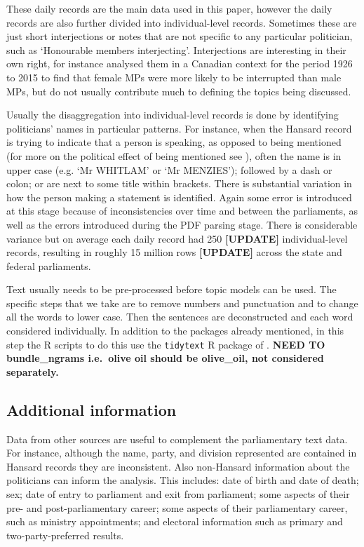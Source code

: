 \documentclass[12pt,]{article}
\theoremstyle{definition}
\theoremstyle{definition}
\theoremstyle{definition}
\theoremstyle{remark}
\begin{document}
These daily records are the main data used in this paper, however the
daily records are also further divided into individual-level records.
Sometimes these are just short interjections or notes that are not
specific to any particular politician, such as `Honourable members
interjecting'. Interjections are interesting in their own right, for
instance \citet{Whyte2017} analysed them in a Canadian context for the
period 1926 to 2015 to find that female MPs were more likely to be
interrupted than male MPs, but do not usually contribute much to
defining the topics being discussed.

Usually the disaggregation into individual-level records is done by
identifying politicians' names in particular patterns. For instance,
when the Hansard record is trying to indicate that a person is speaking,
as opposed to being mentioned (for more on the political effect of being
mentioned see \citet{Alexander2018}), often the name is in upper case
(e.g. `Mr WHITLAM' or `Mr MENZIES'); followed by a dash or colon; or are
next to some title within brackets. There is substantial variation in
how the person making a statement is identified. Again some error is
introduced at this stage because of inconsistencies over time and
between the parliaments, as well as the errors introduced during the PDF
parsing stage. There is considerable variance but on average each daily
record had 250 \textbf{{[}UPDATE{]}} individual-level records, resulting
in roughly 15 million rows \textbf{{[}UPDATE{]}} across the state and
federal parliaments.

Text usually needs to be pre-processed before topic models can be used.
The specific steps that we take are to remove numbers and punctuation
and to change all the words to lower case. Then the sentences are
deconstructed and each word considered individually. In addition to the
packages already mentioned, in this step the R scripts to do this use
the \texttt{tidytext} R package of \citet{SilgeRobinson2016}.
\textbf{NEED TO bundle\_ngrams i.e.~olive oil should be olive\_oil, not
considered separately.}

\subsection{Additional information}\label{additional-information}

Data from other sources are useful to complement the parliamentary text
data. For instance, although the name, party, and division represented
are contained in Hansard records they are inconsistent. Also non-Hansard
information about the politicians can inform the analysis. This
includes: date of birth and date of death; sex; date of entry to
parliament and exit from parliament; some aspects of their pre- and
post-parliamentary career; some aspects of their parliamentary career,
such as ministry appointments; and electoral information such as primary
and two-party-preferred results.
\end{document}
